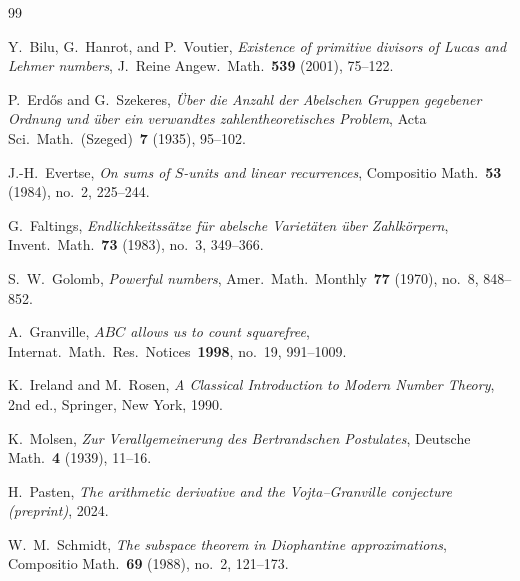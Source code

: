 \documentclass[12pt]{amsart}
\theoremstyle{plain}
\theoremstyle{definition}
\theoremstyle{remark}
\begin{document}
{\sloppy
\begin{thebibliography}{99}

Y.~Bilu, G.~Hanrot, and P.~Voutier,
\emph{Existence of primitive divisors of Lucas and Lehmer numbers},
J.\ Reine Angew.\ Math.~\textbf{539} (2001), 75--122.

P.~Erd\H{o}s and G.~Szekeres,
\emph{\"Uber die Anzahl der Abelschen Gruppen gegebener Ordnung und
  \"uber ein verwandtes zahlentheoretisches Problem},
Acta Sci.\ Math.\ (Szeged)~\textbf{7} (1935), 95--102.

J.-H.~Evertse,
\emph{On sums of $S$-units and linear recurrences},
Compositio Math.~\textbf{53} (1984), no.~2, 225--244.

G.~Faltings,
\emph{Endlichkeitss\"atze f\"ur abelsche Variet\"aten \"uber Zahlk\"orpern},
Invent.\ Math.~\textbf{73} (1983), no.~3, 349--366.

S.~W.~Golomb,
\emph{Powerful numbers},
Amer.\ Math.\ Monthly~\textbf{77} (1970), no.~8, 848--852.

A.~Granville,
\emph{$ABC$ allows us to count squarefree},
Internat.\ Math.\ Res.\ Notices~\textbf{1998}, no.~19, 991--1009.

K.~Ireland and M.~Rosen,
\emph{A Classical Introduction to Modern Number Theory},
2nd ed., Springer, New York, 1990.

K.~Molsen,
\emph{Zur Verallgemeinerung des Bertrandschen Postulates},
Deutsche Math.~\textbf{4} (1939), 11--16.

H.~Pasten,
\emph{The arithmetic derivative and the Vojta--Granville conjecture
  (preprint)}, 2024.

W.~M.~Schmidt,
\emph{The subspace theorem in Diophantine approximations},
Compositio Math.~\textbf{69} (1988), no.~2, 121--173.

\end{thebibliography}
}
\end{document}
